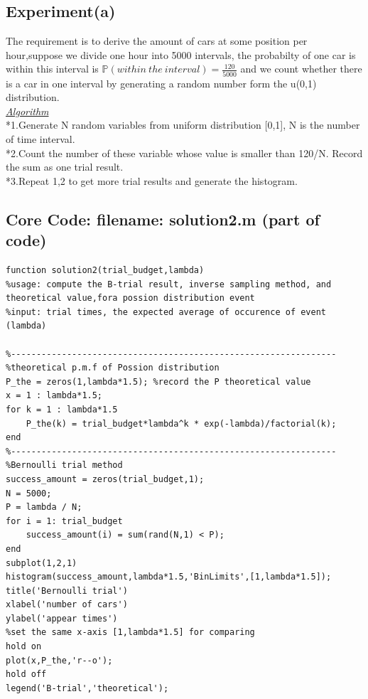 \documentclass[twoside]{article}
\begin{document}
\subsection{\normalsize{Experiment(a)}}
The requirement is to derive the amount of cars at some position per hour,suppose we divide one hour into 5000 intervals, the probabilty of one car is within this interval is $\mathbb{P}(within \ the \ interval)=\frac{120}{5000}$ and we count whether there is a car in one interval by generating a random number form the u(0,1) distribution.\\[10pt]
\underline{\emph{Algorithm}}\\[10pt]
*1.Generate N random variables from uniform distribution [0,1], N is the number of time interval.\\
*2.Count the number of these variable whose value is smaller than 120/N. Record the sum as one trial result.\\
*3.Repeat 1,2 to get more trial results and generate the histogram.\\
\subsection{\normalsize{Core Code: filename: solution2.m (part of code)}}
\begin{lstlisting}
function solution2(trial_budget,lambda)
%usage: compute the B-trial result, inverse sampling method, and theoretical value,fora possion distribution event
%input: trial times, the expected average of occurence of event (lambda)

%----------------------------------------------------------------
%theoretical p.m.f of Possion distribution
P_the = zeros(1,lambda*1.5); %record the P theoretical value
x = 1 : lambda*1.5;
for k = 1 : lambda*1.5  
    P_the(k) = trial_budget*lambda^k * exp(-lambda)/factorial(k);
end
%----------------------------------------------------------------
%Bernoulli trial method
success_amount = zeros(trial_budget,1);
N = 5000;
P = lambda / N;
for i = 1: trial_budget
    success_amount(i) = sum(rand(N,1) < P);
end
subplot(1,2,1)
histogram(success_amount,lambda*1.5,'BinLimits',[1,lambda*1.5]);
title('Bernoulli trial')
xlabel('number of cars')
ylabel('appear times')
%set the same x-axis [1,lambda*1.5] for comparing
hold on
plot(x,P_the,'r--o');
hold off
legend('B-trial','theoretical');
\end{lstlisting}
\end{document}

